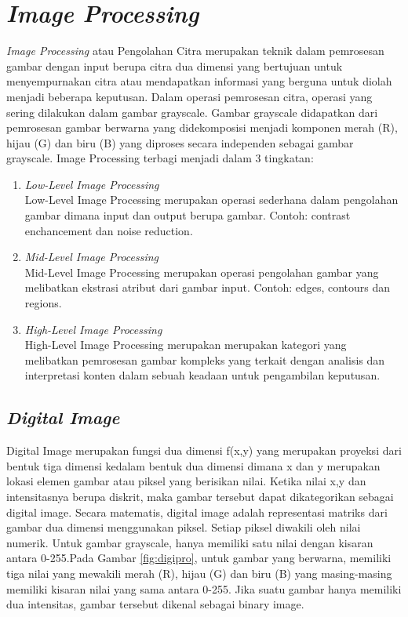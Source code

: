 \section{\textit{Image Processing}}
\textit{Image Processing} atau Pengolahan Citra merupakan teknik
dalam pemrosesan gambar dengan input berupa citra dua dimensi yang bertujuan untuk menyempurnakan citra atau mendapatkan
informasi yang berguna untuk diolah menjadi beberapa keputusan. Dalam operasi pemrosesan citra, operasi yang sering dilakukan
dalam gambar grayscale. Gambar grayscale didapatkan dari pemrosesan gambar berwarna yang didekomposisi menjadi komponen
merah (R), hijau (G) dan biru (B) yang diproses secara independen
sebagai gambar grayscale. Image Processing terbagi menjadi dalam 3 tingkatan\citep{bookDigiPro}:
\begin{enumerate}
	\item \textit{Low-Level Image Processing}\\
	Low-Level Image Processing merupakan operasi sederhana dalam pengolahan gambar dimana input dan output berupa gambar. Contoh: contrast enchancement dan noise reduction.\citep{bookDigiPro}
	\item \textit{Mid-Level Image Processing}\\
	Mid-Level Image Processing merupakan operasi pengolahan
	gambar yang melibatkan ekstrasi atribut dari gambar input.
	Contoh: edges, contours dan regions.\citep{bookDigiPro}
	\item \textit{High-Level Image Processing}\\
	High-Level Image Processing merupakan merupakan kategori
	yang melibatkan pemrosesan gambar kompleks yang terkait
	dengan analisis dan interpretasi konten dalam sebuah keadaan
	untuk pengambilan keputusan.\citep{bookDigiPro}
\end{enumerate}

\subsection{\textit{Digital Image}}
Digital Image merupakan fungsi dua dimensi f(x,y) yang merupakan proyeksi dari bentuk tiga dimensi kedalam bentuk dua dimensi dimana x dan y merupakan lokasi elemen gambar atau piksel yang berisikan nilai. Ketika nilai x,y dan intensitasnya berupa
diskrit, maka gambar tersebut dapat dikategorikan sebagai digital
image. Secara matematis, digital image adalah representasi matriks
dari gambar dua dimensi menggunakan piksel. Setiap piksel diwakili oleh nilai numerik. Untuk gambar grayscale, hanya memiliki satu
nilai dengan kisaran antara 0-255.Pada Gambar \ref{fig:digipro}, untuk gambar yang berwarna, memiliki tiga nilai yang mewakili merah (R),
hijau (G) dan biru (B) yang masing-masing memiliki kisaran nilai
yang sama antara 0-255. Jika suatu gambar hanya memiliki dua
intensitas, gambar tersebut dikenal sebagai binary image.\citep{bookDigiPro}

